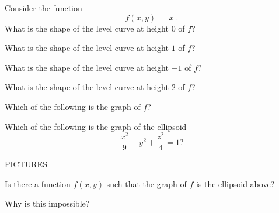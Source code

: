 \documentclass{ximera}
\begin{document}
\begin{problem}
Consider the function
\[
f(x,y) = |x|.
\]
What is the shape of the level curve at height $0$ of $f$?
\begin{multipleChoice}
\end{multipleChoice}

What is the shape of the level curve at height $1$ of $f$?
\begin{multipleChoice}
\end{multipleChoice}

What is the shape of the level curve at height $-1$ of $f$?
\begin{multipleChoice}
\end{multipleChoice}

What is the shape of the level curve at height $2$ of $f$?
\begin{multipleChoice}
\end{multipleChoice}

Which of the following is the graph of $f$?

\end{problem}

\begin{problem}
Which of the following is the graph of the ellipsoid
\[
\frac{x^2}{9}+ y^2 + \frac{z^2}{4} = 1?
\]

PICTURES

Is there a function $f(x,y)$ such that the graph of $f$ is the ellipsoid above?
\begin{multipleChoice}
\end{multipleChoice}

\begin{problem}
Why is this impossible?
\begin{multipleChoice}
\end{multipleChoice}
\end{problem}

\end{problem}
\end{document}
